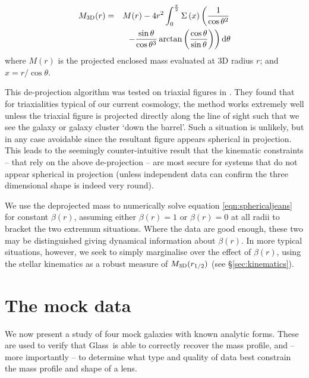 \documentclass[galley,usenatbib]{mn2e}
\newcommand{\Glass}{{\sc Glass}}
\def\cth{\cos\theta}
\def\sth{\sin\theta}
\def\dth{{\rm d}\theta}
\begin{document}
\begin{eqnarray} 
M_{\rm 3D}(r) & = & M(r) - 4r^2 \int_0^{\frac{\pi}{2}} \Sigma\left(x\right) \left(\frac{1}{\cth^2} \right. \nonumber \\ 
& & \left. - \frac{\sth}{\cth^3} \arctan\left(\frac{\cth}{\sth}\right) \right) \dth
\end{eqnarray}
where $M(r)$ is the projected enclosed mass evaluated at 3D radius $r$; and $x = r/\cth$. 

This de-projection algorithm was tested on triaxial figures in
\citet{2006ApJ...652L...5S}. They found that for triaxialities typical of our
current cosmology, the method works extremely well unless the triaxial figure
is projected directly along the line of sight such that we see the galaxy or
galaxy cluster `down the barrel'. Such a situation is unlikely, but in any case
avoidable since the resultant figure appears spherical in projection. This
leads to the seemingly counter-intuitive result that the kinematic constraints
-- that rely on the above de-projection -- are most secure for systems that do
not appear spherical in projection (unless independent data can confirm the
three dimensional shape is indeed very round). 

We use the deprojected mass to numerically solve equation
\ref{eqn:sphericaljeans} for constant $\beta(r)$, assuming either $\beta(r) =
1$ or $\beta(r) = 0$ at all radii to bracket the two extremum situations. Where
the data are good enough, these two may be distinguished giving dynamical
information about $\beta(r)$. In more typical situations, however, we seek to
simply marginalise over the effect of $\beta(r)$, using the stellar kinematics
as a robust measure of $M_{\rm 3D}(r_{1/2})$ (see \S\ref{sec:kinematics}). 


\section{The mock data}\label{sec:mockdata}

We now present a study of four mock galaxies with known analytic forms. These
are used to verify that \Glass\ is able to correctly recover the mass profile,
and -- more importantly -- to determine what type and quality of data best
constrain the mass profile and shape of a lens.
\end{document}
